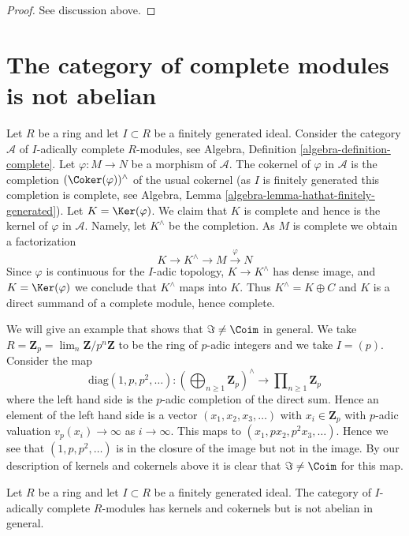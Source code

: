 \begin{proof}
See discussion above.
\end{proof}



\section{The category of complete modules is not abelian}
\label{section-non-abelian}


\noindent
Let $R$ be a ring and let $I \subset R$ be a finitely generated ideal.
Consider the category $\mathcal{A}$ of $I$-adically complete
$R$-modules, see
Algebra, Definition \ref{algebra-definition-complete}.
Let $\varphi : M \to N$ be a morphism of $\mathcal{A}$.
The cokernel of $\varphi$ in $\mathcal{A}$ is the completion
$(\Coker(\varphi))^\wedge$ of the usual cokernel
(as $I$ is finitely generated this completion is complete, see
Algebra, Lemma \ref{algebra-lemma-hathat-finitely-generated}).
Let $K = \Ker(\varphi)$. We claim that $K$ is complete and
hence is the kernel of $\varphi$ in $\mathcal{A}$. Namely, let
$K^\wedge$ be the completion. As $M$ is complete we obtain a factorization
$$
K \to K^\wedge \to M \xrightarrow{\varphi} N
$$
Since $\varphi$ is continuous for the $I$-adic topology, $K \to K^\wedge$
has dense image, and $K = \Ker(\varphi)$ we conclude that $K^\wedge$
maps into $K$. Thus $K^\wedge = K \oplus C$ and $K$ is a direct summand
of a complete module, hence complete.

\medskip\noindent
We will give an example that shows that $\Im \not = \Coim$
in general. We take $R = \mathbf{Z}_p = \lim_n \mathbf{Z}/p^n\mathbf{Z}$
to be the ring of $p$-adic integers and we take $I = (p)$.
Consider the map
$$
\text{diag}(1, p, p^2, \ldots) :
\left(\bigoplus\nolimits_{n \geq 1} \mathbf{Z}_p\right)^\wedge
\longrightarrow
\prod\nolimits_{n \geq 1} \mathbf{Z}_p
$$
where the left hand side is the $p$-adic completion of the direct sum.
Hence an element of the left hand side is a vector $(x_1, x_2, x_3, \ldots)$
with $x_i \in \mathbf{Z}_p$ with $p$-adic valuation $v_p(x_i) \to \infty$ as
$i \to \infty$. This maps to $(x_1, px_2, p^2x_3, \ldots)$. Hence we see
that $(1, p, p^2, \ldots)$ is in the closure of the image but not in
the image. By our description of kernels and cokernels above it is
clear that $\Im \not = \Coim$ for this map.

\begin{lemma}
\label{lemma-complete-modules-not-abelian}
Let $R$ be a ring and let $I \subset R$ be a finitely generated ideal.
The category of $I$-adically complete $R$-modules has kernels and
cokernels but is not abelian in general.
\end{lemma}

